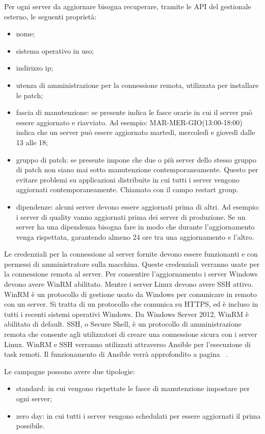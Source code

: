 \noindent Per ogni server da aggiornare bisogna recuperare, tramite le API del gestionale 
esterno, le seguenti proprietà:
\begin{itemize}
\item nome;
\item sistema operativo in uso;
\item indirizzo ip;
\item utenza di amministrazione per la connessione remota, utilizzata per 
installare le patch;
\item fascia di manutenzione: se presente indica le fasce orarie in cui il
server può essere aggiornato e riavviato. Ad esempio: MAR-MER-GIO(13:00-18:00)
indica che un server può essere aggiornato martedì, mercoledì e 
giovedì dalle 13 alle 18;
\item gruppo di patch: se presente impone che due o più server dello
stesso gruppo di patch non siano mai sotto manutenzione contemporaneamente. 
Questo per evitare problemi su applicazioni distribuite in cui tutti i server 
vengono aggiornati contemporaneamente. Chiamato con il campo restart group.
\item dipendenze: alcuni server devono essere aggiornati prima di altri. 
Ad esempio: i server di quality vanno aggiornati prima dei server di produzione.
Se un server ha una dipendenza bisogna fare in modo che durante l’aggiornamento
venga rispettata, garantendo almeno 24 ore tra una aggiornamento e l'altro.
\end{itemize}
Le credenziali per la connessione al server fornite devono essere funzionanti e con 
permessi di amministratore sulla macchina. Queste credenziali verranno usate
per la connessione remota al server.
Per consentire l’aggiornamento i server Windows devono avere WinRM abilitato.
Mentre i server Linux devono avere SSH attivo. WinRM è un protocollo di 
gestione usato da Windows per comunicare in remoto con un server. 
Si tratta di un protocollo che comunica su HTTPS, ed è incluso in tutti 
i recenti sistemi operativi Windows. Da Windows Server 2012, WinRM è 
abilitato di default. 
SSH, o Secure Shell, è un protocollo di amministrazione remota che consente 
agli utilizzatori di creare una connessione sicura con i server Linux.
WinRM e SSH verranno utilizzati attraverso Ansible per l’esecuzione di task
remoti. Il funzionamento di Ansible verrà approfondito a 
pagina ~\pageref{subsec:Ansible}.

\noindent Le campagne possono avere due tipologie:
\begin{itemize}
\item standard: in cui vengono rispettate le fasce di manutenzione impostare 
per ogni server;
\item zero day: in cui tutti i server vengono schedulati per essere 
aggiornati il prima possibile.
\end{itemize}


